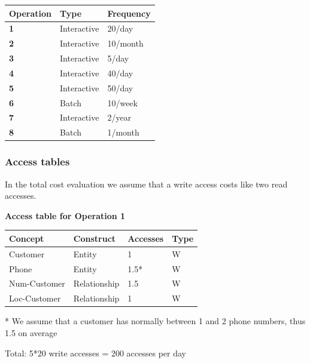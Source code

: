 \documentclass{article}[h]
\begin{document}
{\begin{table}[H]
  \def\arraystretch{1.25}%
  \centering
  \begin{tabular}{ | m{2.5cm} | m{3.5cm}| m{3.5cm} |}  
    \hline
    {\textbf{\large Operation}} & {\textbf{\large Type}} & {\textbf{\large Frequency}} \\ 
    \hline
    \color[HTML]{3531FF} \textbf{1} & Interactive & 20/day  \\ 
    \hline
    \color[HTML]{3531FF} \textbf{2} & Interactive & 10/month  \\ 
    \hline
    \color[HTML]{3531FF} \textbf{3} & Interactive & 5/day  \\ 
    \hline
    \color[HTML]{3531FF} \textbf{4} & Interactive & 40/day  \\ 
    \hline
    \color[HTML]{3531FF} \textbf{5} & Interactive & 50/day  \\ 
    \hline
    \color[HTML]{3531FF} \textbf{6} & Batch & 10/week  \\ 
    \hline
    \color[HTML]{3531FF} \textbf{7} & Interactive & 2/year  \\ 
    \hline
    \color[HTML]{3531FF} \textbf{8} & Batch & 1/month  \\ 
    \hline
  \end{tabular}
\end{table}

\pagebreak

\subsubsection{Access tables}

In the total cost evaluation we assume that a write access costs like two read accesses.

\vspace{12px}


{\centering \textbf{Access table for Operation 1}\\}
\begin{table}[H]
  \def\arraystretch{1.10}%
  \centering
  \begin{tabular}{ | m{4cm} | m{4cm}| m{3cm} | m{2cm} |} 
    \hline
    {\textbf{\large Concept}} & {\textbf{\large Construct}} & {\textbf{\large Accesses}} & {\textbf{\large Type}} \\
    \hline
    \color[HTML]{3531FF} Customer & Entity & 1 & W \\ 
    \hline
    \color[HTML]{3531FF} Phone & Entity & 1.5* & W \\ 
    \hline
    \color[HTML]{3531FF} Num-Customer & Relationship & 1.5 & W \\ 
    \hline
    \color[HTML]{3531FF} Loc-Customer & Relationship & 1 & W \\ 
    \hline
  \end{tabular}
  * \small{We assume that a customer has normally between 1 and 2 phone numbers, thus 1.5 on average}
\end{table}
Total: 5*20 write accesses = 200 accesses per day

}
\end{document}
